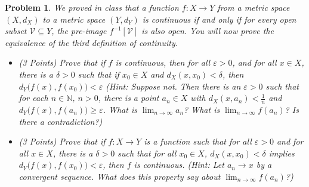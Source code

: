\documentclass{article}
\theoremstyle{normal}
\newtheorem{problem}{Problem}
\begin{document}
    \clearpage
    \color{blue}
    \begin{problem}
        We proved in class that a function
        $f:X\rightarrow{Y}$ from a metric space $(X,d_{X})$ to a metric space
        $(Y,d_{Y})$ is continuous if and only if for every open subset
        $\mathcal{V}\subseteq{Y}$, the pre-image $f^{-1}[\mathcal{V}]$ is also
        open. You will now prove the equivalence of the third definition of
        continuity.
        \begin{itemize}
            \item (3 Points) Prove that if $f$ is continuous, then
                for all $\varepsilon>0$, and for all $x\in{X}$, there is a
                $\delta>0$ such that if $x_{0}\in{X}$ and
                $d_{X}(x,x_{0})<\delta$,
                then $d_{Y}\big(f(x),f(x_{0})\big)<\varepsilon$
                (Hint: Suppose not. Then there is an $\varepsilon>0$ such that
                for each $n\in\mathbb{N}$, $n>0$,
                there is a point $a_{n}\in{X}$ with $d_{X}(x,a_{n})<\frac{1}{n}$
                and $d_{Y}\big(f(x),f(a_{n})\big)\geq\varepsilon$. What is
                $\lim_{n\rightarrow\infty}a_{n}$? What is
                $\lim_{n\rightarrow\infty}f(a_{n})$? Is there a contradiction?)
            \item (3 Points) Prove that if $f:X\rightarrow{Y}$ is a function
                such that for all $\varepsilon>0$ and for all $x\in{X}$, there
                is a $\delta>0$ such that for all $x_{0}\in{X}$,
                $d_{X}(x,x_{0})<\delta$ implies
                $d_{Y}\big(f(x),f(x_{0})\big)<\varepsilon$, then $f$ is
                continuous. (Hint: Let $a_{n}\rightarrow{x}$ by a convergent
                sequence. What does this property say about
                $\lim_{n\rightarrow\infty}f(a_{n})$?)
        \end{itemize}
    \end{problem}
    \color{black}
\end{document}
